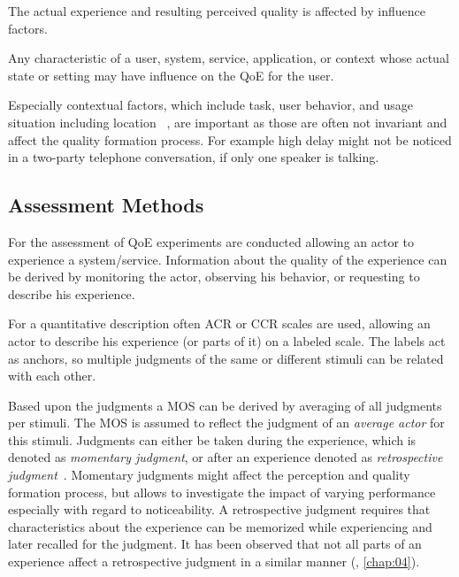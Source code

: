 The actual experience and resulting perceived quality is affected by influence factors.
\begin{definition}
Any characteristic of a user, system, service, application, or context whose actual state or setting may have influence on the \ac{QoE} for the user.~\citep[][p.~56]{reiter_quality_2014}
\end{definition}
Especially contextual factors, which include task, user behavior, and usage situation including location ~\citep[\cf,][p.~56]{reiter_quality_2014}, are important as those are often not invariant and affect the quality formation process.
For example high delay might not be noticed in a two-party telephone conversation, if only one speaker is talking.

\subsection{Assessment Methods}
For the assessment of \ac{QoE} experiments are conducted allowing an actor to experience a system/service.
Information about the quality of the experience can be derived by monitoring the actor, observing his behavior, or requesting to describe his experience.

For a quantitative description often \acf{ACR} or \acf{CCR} scales are used, allowing an actor to describe his experience (or parts of it) on a labeled scale.
The labels act as anchors, so multiple judgments of the same or different stimuli can be related with each other.

Based upon the judgments a \acf{MOS} can be derived by averaging of all judgments per stimuli.
The \ac{MOS} is assumed to reflect the judgment of an \emph{average actor} for this stimuli.
Judgments can either be taken during the experience, which is denoted as \emph{momentary judgment}, or after an experience denoted as \emph{retrospective judgment}~\citep[\cf,][]{weiss_temporal_2014}.
Momentary judgments might affect the perception and quality formation process, but allows to investigate the impact of varying performance especially with regard to noticeability.
A retrospective judgment requires that characteristics about the experience can be memorized while experiencing and later recalled for the judgment.
It has been observed that not all parts of an experience affect a retrospective judgment in a similar manner (\cf, \autoref{chap:04}).

